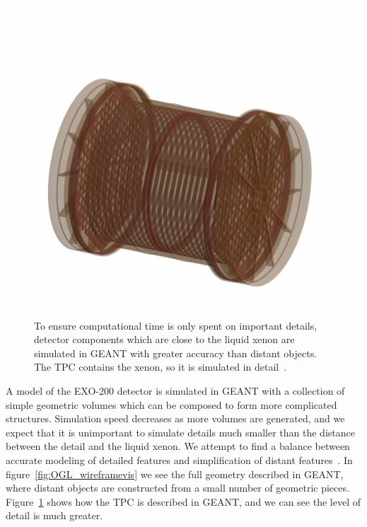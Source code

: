 \begin{figure}
\begin{center}
\includegraphics[keepaspectratio=true,width=\textwidth,clip=true,trim=20mm 30mm 35mm 125mm]{TPC_Cu_RayTracer.jpeg}
\end{center}
\renewcommand{\baselinestretch}{1}
\small\normalsize
\begin{quote}
\caption{To ensure computational time is only spent on important details, detector components which are close to the liquid xenon are simulated in GEANT with greater accuracy than distant objects.  The TPC contains the xenon, so it is simulated in detail~\cite{MCDocumentRun2a}.}
\label{fig:RayTracer_TPConly}
\end{quote}
\end{figure}
\renewcommand{\baselinestretch}{2}
\small\normalsize

A model of the EXO-200 detector is simulated in GEANT with a collection of simple geometric volumes which can be composed to form more complicated structures.  Simulation speed decreases as more volumes are generated, and we expect that it is unimportant to simulate details much smaller than the distance between the detail and the liquid xenon.  We attempt to find a balance between accurate modeling of detailed features and simplification of distant features~\cite{MCDocumentRun2a}.  In figure~\ref{fig:OGL_wireframevis} we see the full geometry described in GEANT, where distant objects are constructed from a small number of geometric pieces.  Figure~\ref{fig:RayTracer_TPConly} shows how the TPC is described in GEANT, and we can see the level of detail is much greater.

